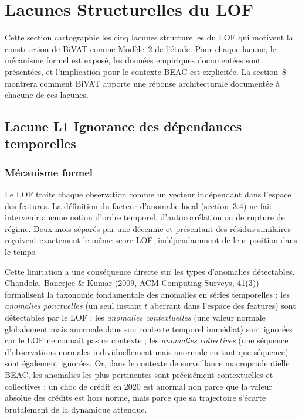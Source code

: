 \documentclass[12pt,a4paper]{article}
\begin{document}
\section{Lacunes Structurelles du LOF}

Cette section cartographie les cinq lacunes structurelles du LOF qui
motivent la construction de BiVAT comme Modèle~2 de l'étude. Pour chaque
lacune, le mécanisme formel est exposé, les données empiriques documentées
sont présentées, et l'implication pour le contexte BEAC est explicitée.
La section~8 montrera comment BiVAT apporte une réponse architecturale
documentée à chacune de ces lacunes.

\subsection{Lacune L1  Ignorance des dépendances temporelles}

\subsubsection{Mécanisme formel}

Le LOF traite chaque observation comme un vecteur indépendant dans l'espace
des features. La définition du facteur d'anomalie local (section~3.4) ne fait
intervenir aucune notion d'ordre temporel, d'autocorrélation ou de rupture de
régime. Deux mois séparés par une décennie et présentant des résidus similaires
reçoivent exactement le même score LOF, indépendamment de leur position dans
le temps.

Cette limitation a une conséquence directe sur les types d'anomalies
détectables. Chandola, Banerjee \& Kumar (2009, ACM Computing Surveys, 41(3))
formalisent la taxonomie fondamentale des anomalies en séries temporelles :
les \textit{anomalies ponctuelles} (un seul instant $t$ aberrant dans l'espace
des features) sont détectables par le LOF ; les \textit{anomalies contextuelles}
(une valeur normale globalement mais anormale dans son contexte temporel
immédiat) sont ignorées car le LOF ne connaît pas ce contexte ; les
\textit{anomalies collectives} (une séquence d'observations normales
individuellement mais anormale en tant que séquence) sont également ignorées.
Or, dans le contexte de surveillance macroprudentielle BEAC, les anomalies
les plus pertinentes sont précisément contextuelles et collectives : un choc
de crédit en 2020 est anormal non parce que la valeur absolue des crédits est
hors norme, mais parce que sa trajectoire s'écarte brutalement de la dynamique
attendue.
\end{document}
